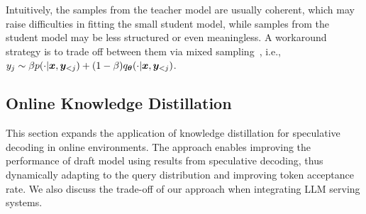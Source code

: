 Intuitively, the samples from the teacher model are usually coherent, which may raise difficulties in fitting the small student model, while samples from the student model may be less structured or even meaningless. 
A workaround strategy is to trade off between them via mixed sampling~\citep{gu2023knowledge}, i.e., $y_j \sim \beta{p(\cdot|{\bm{x}}, {\bm{y}}_{<j})} + (1-\beta) q_{\bm{\theta}}(\cdot|{\bm{x}}, {\bm{y}}_{<j})$. 







\subsection{Online Knowledge Distillation}
This section expands the application of knowledge distillation for speculative decoding in online environments. 
The approach enables improving the performance of draft model using results from speculative decoding, 
thus dynamically adapting to the query distribution and improving token acceptance rate. 
We also discuss the trade-off of our approach when integrating LLM serving systems.


